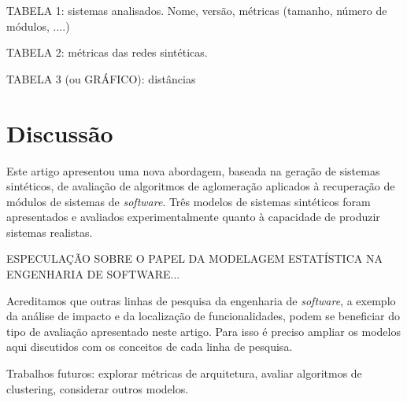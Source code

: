 \documentclass{acm_proc_article-sp}
\begin{document}
TABELA 1: sistemas analisados. Nome, versão, métricas (tamanho, número de módulos, ....)

TABELA 2: métricas das redes sintéticas.

TABELA 3 (ou GRÁFICO): distâncias


\section{Discussão} \label{sec:discussao} %

Este artigo apresentou uma nova abordagem, baseada na geração de sistemas sintéticos, de avaliação de algoritmos de aglomeração aplicados à recuperação de módulos de sistemas de \emph{software}. Três modelos de sistemas sintéticos foram apresentados e avaliados experimentalmente quanto à capacidade de produzir sistemas realistas.


ESPECULAÇÃO SOBRE O PAPEL DA MODELAGEM ESTATÍSTICA NA ENGENHARIA DE SOFTWARE...


Acreditamos que outras linhas de pesquisa da engenharia de \emph{software}, a exemplo da análise de impacto e da localização de funcionalidades, podem se beneficiar do tipo de avaliação apresentado neste artigo. Para isso é preciso ampliar os modelos aqui discutidos com os conceitos de cada linha de pesquisa.

Trabalhos futuros: explorar métricas de arquitetura, avaliar algoritmos de clustering, considerar outros modelos.


%


\end{document}
